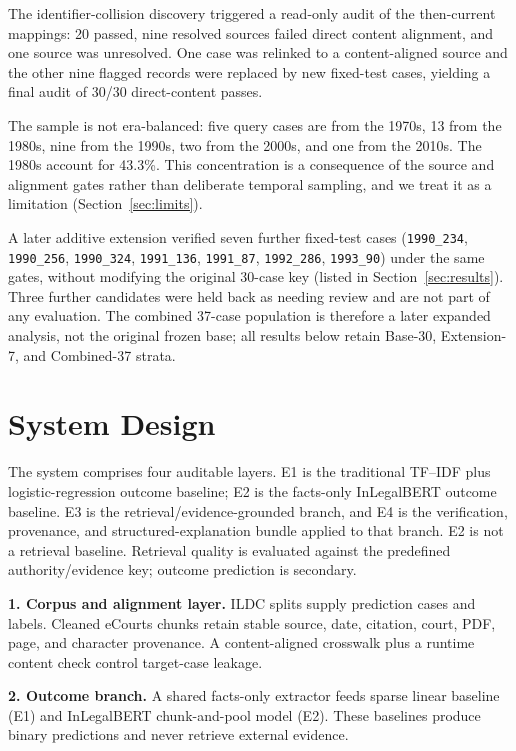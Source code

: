 \documentclass[conference]{IEEEtran}
\begin{document}
The identifier-collision discovery triggered a read-only audit of the
then-current mappings: 20 passed, nine resolved sources failed direct content
alignment, and one source was unresolved. One case was relinked to a
content-aligned source and the other nine flagged records were replaced by new
fixed-test cases, yielding a final audit of 30/30 direct-content passes.

The sample is not era-balanced: five query cases are from the 1970s, 13 from the
1980s, nine from the 1990s, two from the 2000s, and one from the 2010s. The
1980s account for 43.3\%. This concentration is a consequence of the source and
alignment gates rather than deliberate temporal sampling, and we treat it as a
limitation (Section~\ref{sec:limits}).

A later additive extension verified seven further fixed-test cases
(\texttt{1990\_234}, \texttt{1990\_256}, \texttt{1990\_324},
\texttt{1991\_136}, \texttt{1991\_87}, \texttt{1992\_286},
\texttt{1993\_90}) under the
same gates, without modifying the original 30-case key
(listed in Section~\ref{sec:results}). Three further
candidates were held back as needing review and are not part of
any evaluation. The combined 37-case population is therefore a later expanded
analysis, not the original frozen base; all results below retain
Base-30, Extension-7, and Combined-37 strata.

\section{System Design}

The system comprises four auditable layers. E1 is the traditional TF--IDF plus
logistic-regression outcome baseline; E2 is the facts-only InLegalBERT outcome
baseline. E3 is the retrieval/evidence-grounded branch, and E4 is the
verification, provenance, and structured-explanation bundle applied to that
branch. E2 is not a retrieval baseline. Retrieval quality is evaluated against
the predefined authority/evidence key; outcome prediction is secondary.

\textbf{1. Corpus and alignment layer.} ILDC splits supply prediction cases
and labels. Cleaned eCourts chunks retain stable source, date, citation, court,
PDF, page, and character provenance. A content-aligned crosswalk plus a runtime
content check control target-case leakage.

\textbf{2. Outcome branch.} A shared facts-only extractor feeds sparse linear
baseline (E1) and InLegalBERT chunk-and-pool model (E2). These baselines
produce binary predictions and never retrieve external evidence.
\end{document}
